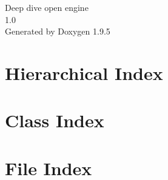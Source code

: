 \documentclass[twoside]{book}
\newcommand{\+}{\discretionary{\mbox{\scriptsize$\hookleftarrow$}}{}{}}
\newcommand{\clearemptydoublepage}{%
    \newpage{\pagestyle{empty}\cleardoublepage}%
  }
\begin{document}
  \raggedbottom
    \hypersetup{pageanchor=false,
                bookmarksnumbered=true,
                pdfencoding=unicode
               }
  \begin{titlepage}
  \vspace*{7cm}
  \begin{center}%
  {\Large Deep dive open engine}\\
  [1ex]\large 1.\+0 \\
  \vspace*{1cm}
  {\large Generated by Doxygen 1.9.5}\\
  \end{center}
  \end{titlepage}
  \clearemptydoublepage
  \tableofcontents
  \clearemptydoublepage
  \hypersetup{pageanchor=true}
\chapter{Hierarchical Index}

\chapter{Class Index}

\chapter{File Index}

\end{document}
